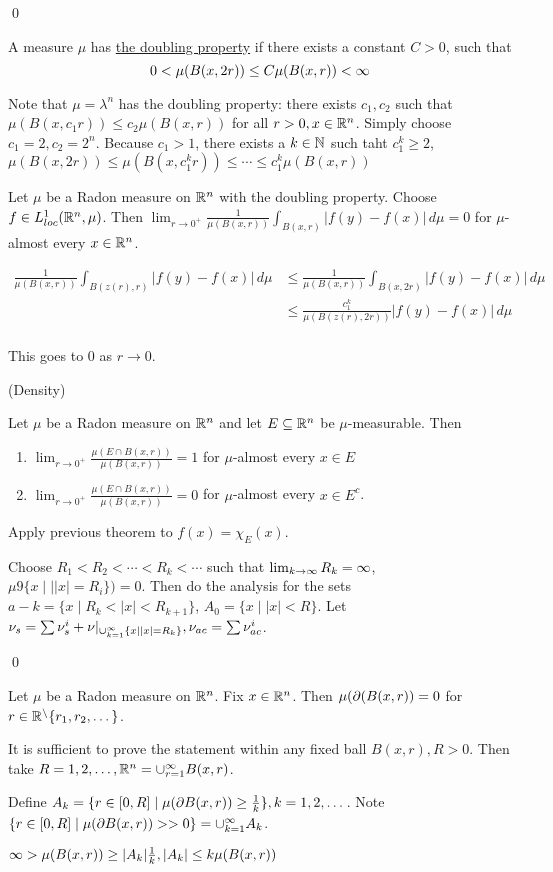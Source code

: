 \documentclass[x11names,reqno,14pt]{extarticle}
\newcommand{\seq}[2][\oo]{_{#2 = 1}^#1}
\newcommand{\cupk}[1][\oo]{\cup\seq[#1]{k}}
\newcommand{\loc}{loc}
\begin{document}
\qed


A measure $\mu$ has \underline{the doubling property} if there exists a constant $C>0$, such that
\[
0< \mu(B(x, 2r)) \leq C\mu(B(x, r)) < \infty
\]

\rem

Note that $\mu = \lambda^n$ has the doubling property: there exists $c_1, c_2$ such that $\mu(B(x, c_1r)) \leq c_2\mu(B(x, r))$ for all $r > 0, x \in \mathbb{R}^n$. Simply choose $c_1 = 2, c_2 = 2^n$. Because $c_1 > 1$, there exists a $k\in\mathbb{N}$ such taht $c_1^k\geq2$, $\mu(B(x, 2r)) \leq \mu(B(x, c_1^kr)) \leq \cdots \leq c_1^k\mu(B(x, r))$

\thm Let $\mu$ be a Radon measure on $\mathbb{R}^n$ with the doubling property. Choose $f \in L^1_{\loc}(\R^n,\mu)$. Then $\lim_{r\to0^+}\frac{1}{\mu(B(x, r))}\int_{B(x, r)}|f(y) - f(x)|\,d\mu = 0$ for $\mu$-almost every $x \in \mathbb{R}^n$. 

\proof

\begin{align*}
\frac{1}{\mu(B(x, r))}\int_{B(z(r), r)}|f(y) - f(x)|\,d\mu & \leq \frac{1}{\mu(B(x, r))}\int_{B(x, 2r)}|f(y) - f(x)|\,d\mu \\
& \leq \frac{c_1^k}{\mu(B(z(r), 2r))}|f(y) - f(x)|\,d\mu \\
\end{align*}

This goes to 0 as $r\to 0$. 

\thm (Density)

Let $\mu$ be a Radon measure on $\mathbb{R}^n$ and let $E \subseteq \mathbb{R}^n$ be $\mu$-measurable. Then
\begin{enumerate}

\item $\lim_{r\to0^+}\frac{\mu(E \cap B(x, r))}{\mu(B(x, r))} = 1$ for $\mu$-almost every $x \in E$
\item $\lim_{r\to0^+}\frac{\mu(E \cap B(x, r))}{\mu(B(x, r))} = 0$ for $\mu$-almost every $x \in E^c$.

\end{enumerate}

\proof

Apply previous theorem to $f(x) = \chi_{E}(x)$.

Choose $R_1 < R_2 < \cdots < R_k < \cdots$ such that $\lim_{k\to\infty}R_k = \infty$, $\mu9\{x\mid||x| = R_i\}) = 0$. Then do the analysis for the sets $a-k = \{x\mid R_k < |x| < R_{k + 1}\}$, $A_0 = \{x\mid |x| < R\}$. Let $\nu_s = \sum\nu_s^i + \nu|_{\cupk\{x\mid |x| = R_k\}}, \nu_{ac} =\sum\nu_{ac}^i$. 

\qed

\lem

Let $\mu$ be a Radon measure on $\mathbb{R}^n$. Fix $x\in\mathbb{R}^n$. Then $\mu(\partial(B(x, r)) = 0$ for $r \in \mathbb{R}^\setminus\{r_1, r_2, \dots\}$. 

\proof

It is sufficient to prove the statement within any fixed ball $B(x, r), R> 0$. Then take $R = 1, 2, \dots, \R^n = \cup\seq{r}B(x, r)$.

Define $A_k = \{r\in[0,R]\mid \mu(\partial B(x, r)) \geq \frac{1}{k}\}, k = 1, 2, \dots $. Note $\{r\in[0,R]\mid \mu(\del B(x, r)) > >0 \} = \cupk A_k$. 

$\infty > \mu(B(x, r)) \geq |A_k|\frac{1}{k}, |A_k| \leq k\mu(B(x, r))$
\end{document}
